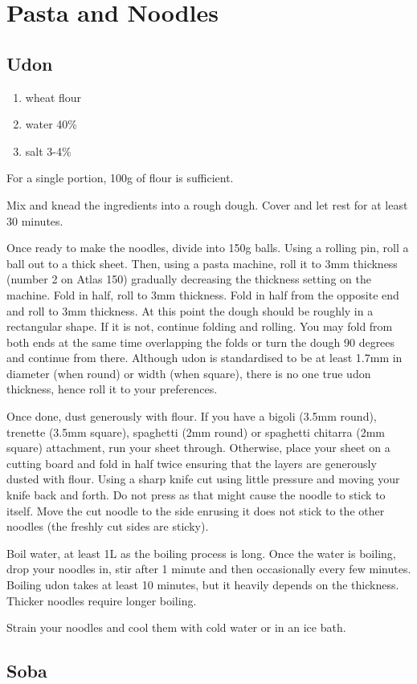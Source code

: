 \chapter{Pasta and Noodles}
\section{Udon}
\begin{enumerate}
  \item wheat flour
  \item water 40\%
  \item salt 3-4\%
\end{enumerate}

For a single portion, 100g of flour is sufficient.

Mix and knead the ingredients into a rough dough. Cover and let rest for at
least 30 minutes.

Once ready to make the noodles, divide into 150g balls. Using a rolling pin,
roll a ball out to a thick sheet. Then, using a pasta machine, roll it to 3mm
thickness (number 2 on Atlas 150) gradually decreasing the thickness setting on
the machine. Fold in half, roll to 3mm thickness. Fold in half from the
opposite end and roll to 3mm thickness. At this point the dough should be
roughly in a rectangular shape. If it is not, continue folding and rolling. You
may fold from both ends at the same time overlapping the folds or turn the
dough 90 degrees and continue from there. Although udon is standardised to be
at least 1.7mm in diameter (when round) or width (when square), there is no one
true udon thickness, hence roll it to your preferences.

Once done, dust generously with flour. If you have a bigoli (3.5mm round),
trenette (3.5mm square), spaghetti (2mm round) or spaghetti chitarra (2mm
square) attachment, run your sheet through. Otherwise, place your sheet on a
cutting board and fold in half twice ensuring that the layers are generously
dusted with flour. Using a sharp knife cut using little pressure and moving
your knife back and forth. Do not press as that might cause the noodle to stick
to itself. Move the cut noodle to the side enrusing it does not stick to the
other noodles (the freshly cut sides are sticky).

Boil water, at least 1L as the boiling process is long. Once the water is
boiling, drop your noodles in, stir after 1 minute and then occasionally every
few minutes. Boiling udon takes at least 10 minutes, but it heavily depends on
the thickness. Thicker noodles require longer boiling.

Strain your noodles and cool them with cold water or in an ice bath.

\section{Soba}

